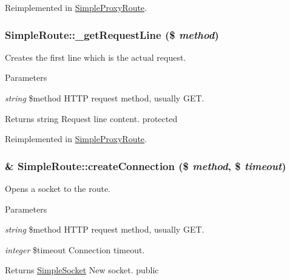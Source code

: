 Reimplemented in \hyperlink{class_simple_proxy_route_a5b9617cdd91cbcc393ea84097b5b16ce}{SimpleProxyRoute}.\hypertarget{class_simple_route_a7480c99e9ebcac13f1d84b4eb676f02d}{
\subsubsection[{\_\-getRequestLine}]{\setlength{\rightskip}{0pt plus 5cm}SimpleRoute::\_\-getRequestLine (\$ {\em method})}}
\label{class_simple_route_a7480c99e9ebcac13f1d84b4eb676f02d}
Creates the first line which is the actual request. 
\begin{DoxyParams}{Parameters}
\item[{\em string}]\$method HTTP request method, usually GET. \end{DoxyParams}
\begin{DoxyReturn}{Returns}
string Request line content.  protected 
\end{DoxyReturn}


Reimplemented in \hyperlink{class_simple_proxy_route_a47e158c297e31c2a2988a3a7d586ffb2}{SimpleProxyRoute}.\hypertarget{class_simple_route_a686424eff035f1a37bbf13e997a072af}{
\subsubsection[{createConnection}]{\setlength{\rightskip}{0pt plus 5cm}\& SimpleRoute::createConnection (\$ {\em method}, \/  \$ {\em timeout})}}
\label{class_simple_route_a686424eff035f1a37bbf13e997a072af}
Opens a socket to the route. 
\begin{DoxyParams}{Parameters}
\item[{\em string}]\$method HTTP request method, usually GET. \item[{\em integer}]\$timeout Connection timeout. \end{DoxyParams}
\begin{DoxyReturn}{Returns}
\hyperlink{class_simple_socket}{SimpleSocket} New socket.  public 
\end{DoxyReturn}



